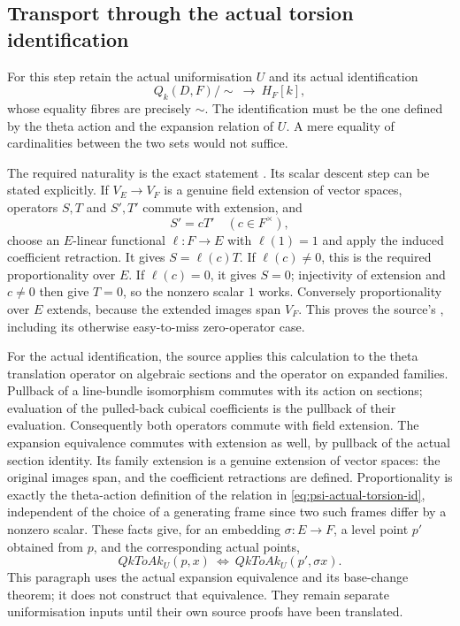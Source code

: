 \subsection{Transport through the actual torsion identification}
For this step retain the actual uniformisation \(U\) and its actual
identification
\[
       Q_k(D,F)/{\sim}\ \longrightarrow\ H_F[k],
 \tag{PU8}\label{eq:psi-actual-torsion-id}
\]
whose equality fibres are precisely \(\sim\).
The identification must be the one defined by the theta action and
the expansion relation of \(U\).  A mere equality of cardinalities
between the two sets would not suffice.

The required naturality is the exact statement
.  Its scalar descent step can be stated
explicitly.  If \(V_E\to V_F\) is a genuine field extension of vector
spaces, operators \(S,T\) and \(S',T'\) commute with extension, and
\[
                         S'=cT'\quad(c\in F^\times),
\]
choose an \(E\)-linear functional \(\ell:F\to E\) with \(\ell(1)=1\)
and apply the induced coefficient retraction.  It gives
\(S=\ell(c)T\).  If \(\ell(c)\ne0\), this is the required
proportionality over \(E\).  If \(\ell(c)=0\), it gives \(S=0\);
injectivity of extension and \(c\ne0\) then give \(T=0\), so the
nonzero scalar \(1\) works.  Conversely proportionality over \(E\)
extends, because the extended images span \(V_F\).
This proves the source's , including its
otherwise easy-to-miss zero-operator case.

For the actual identification, the source applies this calculation
to the theta translation operator on algebraic sections and the
operator on expanded families.  Pullback of a line-bundle
isomorphism commutes with its action on sections; evaluation of the
pulled-back cubical coefficients is the pullback of their evaluation.
Consequently both operators commute with field extension.
The expansion equivalence commutes with extension as well, by
pullback of the actual section identity.  Its family extension is a
genuine extension of vector spaces: the original images span, and
the coefficient retractions are defined.  Proportionality is exactly
the theta-action definition of the relation in
\eqref{eq:psi-actual-torsion-id}, independent of the choice of a
generating frame since two such frames differ by a nonzero scalar.
These facts give, for an embedding \(\sigma:E\to F\), a level point
\(p'\) obtained from \(p\), and the corresponding actual points,
\[
 QkToAk_U(p,x)\ \Longleftrightarrow\
 QkToAk_U(p',\sigma x).
 \tag{PU9}\label{eq:psi-equivariance}
\]
This paragraph uses the actual expansion equivalence and its
base-change theorem; it does not construct that equivalence.
They remain separate uniformisation inputs until their own source
proofs have been translated.

